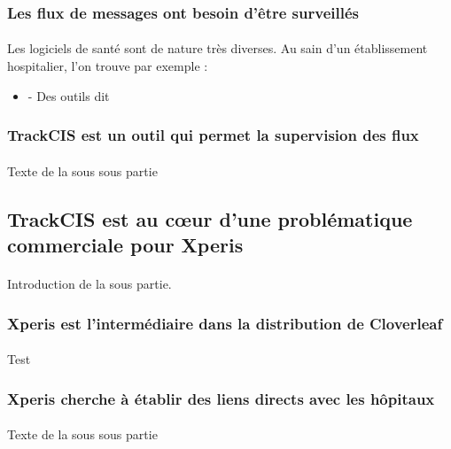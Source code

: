 			
			
			
		\subsubsection{Les flux de messages ont besoin d'être surveillés}
			\paragraph{}
			Les logiciels de santé sont de nature très diverses. Au sain d'un
			établissement hospitalier, l'on trouve par exemple :
			\begin{itemize}
			  \item{-} Des outils dit 
			\end{itemize}
			
			
			
			
			
		\subsubsection{TrackCIS est un outil qui permet la supervision des flux}
			\paragraph{}
			Texte de la sous sous partie
	
	\subsection{TrackCIS est au cœur d'une problématique commerciale pour Xperis}
		\paragraph{}
		Introduction de la sous partie.
		
		\subsubsection{Xperis est l'intermédiaire dans la distribution de Cloverleaf}
			\paragraph{}
			Test
			
		\subsubsection{Xperis cherche à établir des liens directs avec les hôpitaux}
			\paragraph{}
			Texte de la sous sous partie
